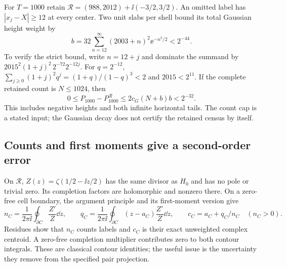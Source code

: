 For $T=1000$ retain
$\mathcal R=(988,2012)+\ii(-3/2,3/2)$.
An omitted label has $|x_j-X|\ge12$ at every center.
Two unit slabs per shell bound its total Gaussian height weight by
\begin{equation}\label{eq:explicit-weight-tail}
 b=32\sum_{n=12}^\infty(2003+n)^2\ee^{-n^2/2}<2^{-44}.
\end{equation}
To verify the strict bound, write $n=12+j$ and dominate the summand by
$2015^2(1+j)^2\,2^{-72}2^{-12j}$. For $q=2^{-12}$,
$\sum_{j\ge0}(1+j)^2q^j=(1+q)/(1-q)^3<2$ and $2015<2^{11}$.
If the complete retained count is $N\le1024$, then
\begin{equation}\label{eq:explicit-projection-tail}
 0\le P_{1000}-P_{1000}^{\mathcal R}
       \le2c_G(N+b)b<2^{-32}.
\end{equation}
This includes negative heights and both infinite horizontal tails.
The count cap is a stated input; the Gaussian decay does not certify
the retained census by itself.

\subsection{Counts and first moments give a second-order error}

On $\mathcal R$, $Z(z)=\zeta(1/2-\ii z/2)$ has the same divisor as
$H_0$ and has no pole or trivial zero. Its completion factors are
holomorphic and nonzero there. On a zero-free cell boundary,
the argument principle and its first-moment version give
\begin{equation}\label{eq:contour-centroid}
 n_C=\frac1{2\pi\ii}\oint_{\partial C}\frac{Z'}Z\dd z,
 \qquad q_C=\frac1{2\pi\ii}\oint_{\partial C}(z-a_C)\frac{Z'}Z\dd z,
 \qquad c_C=a_C+q_C/n_C\quad(n_C>0).
\end{equation}
Residues show that $n_C$ counts labels and $c_C$ is their exact
unweighted complex centroid. A zero-free completion multiplier
contributes zero to both contour integrals. These are classical
contour identities; the useful issue is the uncertainty they remove
from the specified pair projection.

